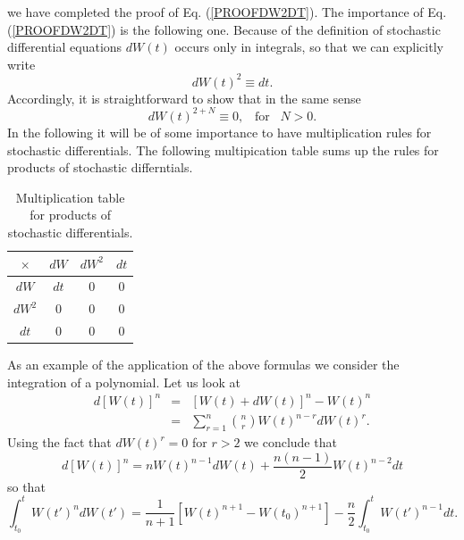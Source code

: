 we have completed the proof of Eq. (\ref{PROOFDW2DT}).
The importance of Eq. (\ref{PROOFDW2DT}) is the following one. Because
of the definition of stochastic differential equations $dW(t)$
occurs only in integrals, so that we can explicitly write
\begin{equation*}
dW(t)^2 \equiv dt.
\end{equation*}
Accordingly, it is straightforward to show that in the same sense
\begin{equation*}
dW(t)^{2+N} \equiv 0, \;\;\; \text{for} \;\;\; N>0.
\end{equation*}
In the following it will be of some importance to have 
multiplication rules for stochastic differentials. The following
multipication table sums up the rules for products of stochastic 
differntials.
\begin{table}
\caption{Multiplication table for products of stochastic differentials.}
\begin{center}
\begin{tabular}{|c||c|c|c|}\hline 
$\times$ & $dW$ & $dW^2$ & $dt$ \\ \hline \hline
$dW$     & $dt$ & $0$    & $0$   \\ \hline
$dW^2$   &  $0$ & $0$    &  $0$  \\ \hline
$dt$     &  $0$ & $0$    & $0$  \\ \hline
\end{tabular}
\end{center}
\end{table}
As an example of the application of the above formulas we consider the
integration of a polynomial. Let us look at
\begin{eqnarray*}
d[W(t)]^n & = & [W(t) + dW(t)]^n - W(t)^n \\
          & = & \sum_{r=1}^n {n \choose r} W(t)^{n-r} dW(t)^r .
\end{eqnarray*}
Using the fact that $dW(t)^r = 0$ for $r>2$ we conclude that
\begin{equation*}
d[W(t)]^n = n W(t)^{n-1}dW(t) +
\frac{n(n-1)}{2} W(t)^{n-2} dt
\end{equation*}
so that
\begin{equation*}
\int_{t_0}^t W(t')^n dW(t') = \frac{1}{n+1}  [W(t)^{n+1} - W(t_0)^{n+1}]
   -\frac{n}{2} \int_{t_0}^t W(t')^{n-1} dt.
\end{equation*}



